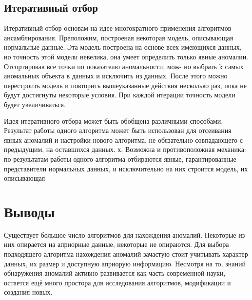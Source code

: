 \subsection{Итеративный отбор}
Итеративный отбор основам на идее многократного применения алгоритмов ансамблирования. Преположим, построеная некоторая модель, описывающая нормальные данные. Эта модель построена на основе всех  имеющихся данных, но точность этой модели невелика, она умеет определить только явные аномалии. Отсортировав все точки по показателю аномальности, мож-
но выбрать k самых аномальных объекта в данных и исключить из данных. После этого можно перестроить модель и повторить вышеуказанные действия несколько раз, пока не будут достигнуты некоторые условия. При каждой итерации точность модели будет увеличиваться.

Идея итеративного отбора может быть обобщена различными способами. Результат работы одного алгоритма может быть использован для отсеивания явных аномалий и настройки нового алгоритма, не обязательно совпадающего с предыдущим, на оставшихся данных. х. Возможна и противоположная механика: по результатам работы одного алгоритма отбираются явные, гарантированные
представители нормальных данных, и исключительно на них строится модель,
их описывающая
\section{Выводы}
Существует большое число алгоритмов для нахождения аномалий. Некоторые из них опирается на априорные данные, некоторые не опираются. Для выбора подходящего алгоритма нахождения аномалий зачастую стоит учитывать характер данных, их размер и доступную априорую информацию. Несмотря на то,  знаний обнаружения аномалий активно развивается как часть современной науки, остается ещё много простора для исследования алгоритмов, модификации и создания новых.




